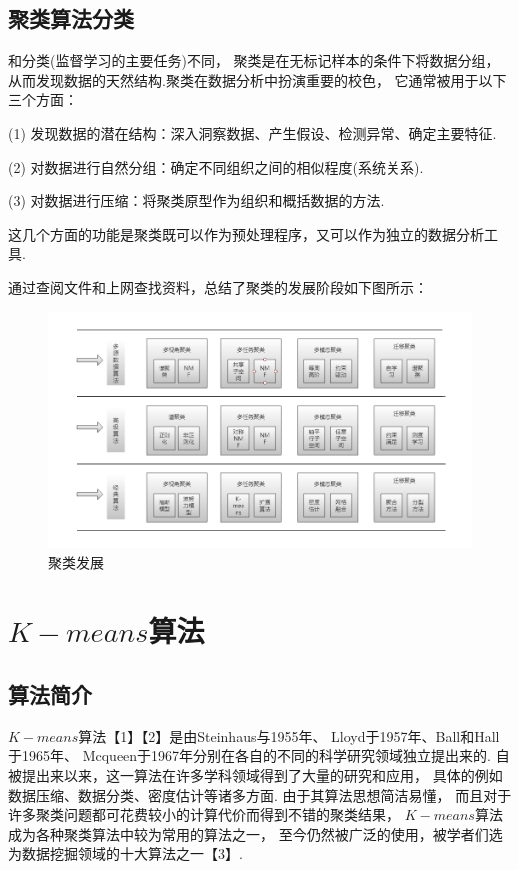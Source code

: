\documentclass[bachelor,adobefonts]{jnuthesis}
\begin{document}
\subsection{聚类算法分类}
和分类(监督学习的主要任务)不同，
聚类是在无标记样本的条件下将数据分组，
从而发现数据的天然结构.聚类在数据分析中扮演重要的校色，
它通常被用于以下三个方面：

(1)	发现数据的潜在结构：深入洞察数据、产生假设、检测异常、确定主要特征.

(2)	对数据进行自然分组：确定不同组织之间的相似程度(系统关系).

(3)	对数据进行压缩：将聚类原型作为组织和概括数据的方法.

这几个方面的功能是聚类既可以作为预处理程序，又可以作为独立的数据分析工具.

通过查阅文件和上网查找资料，总结了聚类的发展阶段如下图所示：

\begin{figure}[h!]
  \centering
    \includegraphics[width=1.0\linewidth]{Wjuleifazhan.png}
  \caption{聚类发展}
\end{figure}


\section{$K-means$算法}
\subsection{算法简介}
$K-means$算法【1】【2】是由Steinhaus与1955年、
Lloyd于1957年、Ball和Hall于1965年、
Mcqueen于1967年分别在各自的不同的科学研究领域独立提出来的.
自被提出来以来，这一算法在许多学科领域得到了大量的研究和应用，
具体的例如数据压缩、数据分类、密度估计等诸多方面.
由于其算法思想简洁易懂，
而且对于许多聚类问题都可花费较小的计算代价而得到不错的聚类结果，
$K-means$算法成为各种聚类算法中较为常用的算法之一，
至今仍然被广泛的使用，被学者们选为数据挖掘领域的十大算法之一【3】.
\end{document}
